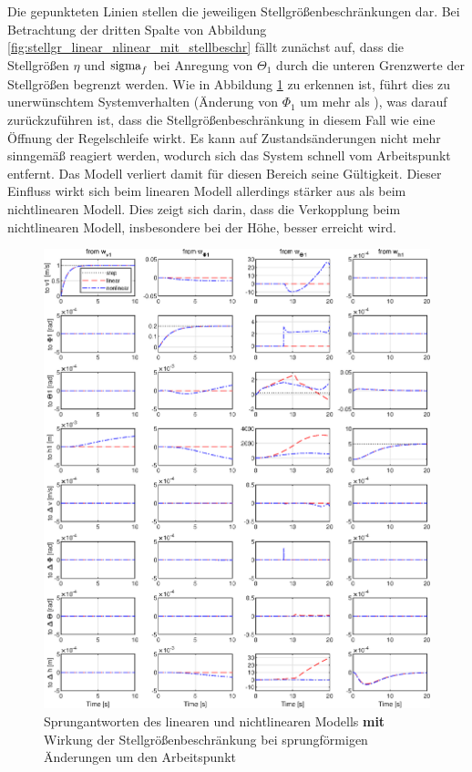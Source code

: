 Die gepunkteten Linien stellen die jeweiligen Stellgrößenbeschränkungen dar. Bei Betrachtung der dritten Spalte von Abbildung \ref{fig:stellgr_linear_nlinear_mit_stellbeschr} fällt zunächst auf, dass die Stellgrößen $\eta$ und $\textnormal{sigma}_f$ bei Anregung von $\Theta_1$ durch die unteren Grenzwerte der Stellgrößen begrenzt werden. Wie in Abbildung \ref{fig:outputs_linear_nlinear_mit_stellbeschr} zu erkennen ist, führt dies zu unerwünschtem Systemverhalten (Änderung von $\Phi_1$ um mehr als ), was darauf zurückzuführen ist, dass die Stellgrößenbeschränkung in diesem Fall wie eine Öffnung der Regelschleife wirkt. Es kann auf Zustandsänderungen nicht mehr sinngemäß reagiert werden, wodurch sich das System schnell vom Arbeitspunkt entfernt. Das Modell verliert damit für diesen Bereich seine Gültigkeit. Dieser Einfluss wirkt sich beim linearen Modell allerdings stärker aus als beim nichtlinearen Modell. Dies zeigt sich darin, dass die Verkopplung beim nichtlinearen Modell, insbesondere bei der Höhe, besser erreicht wird.
\begin{figure}[H] %
	\centering
	\includegraphics[width=\linewidth]{./Bilder/outputs_lin_nlin_mit_beschr_um_AP.eps}
	\caption{Sprungantworten des linearen und nichtlinearen Modells \textbf{mit} Wirkung der Stellgrößenbeschränkung bei sprungförmigen Änderungen um den Arbeitspunkt}
	\label{fig:outputs_linear_nlinear_mit_stellbeschr}
\end{figure}
